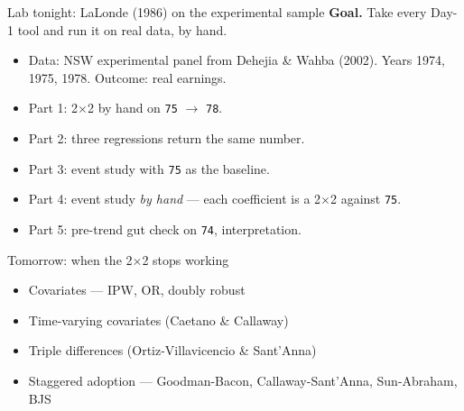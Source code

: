 \documentclass[aspectratio=169,11pt]{beamer}
\begin{document}
\begin{frame}{Lab tonight: LaLonde (1986) on the experimental sample}
\vspace{0.4em}
\textbf{Goal.} Take every Day-1 tool and run it on real data, by hand.
\vspace{0.4em}
\begin{itemize}\small
  \item Data: NSW experimental panel from Dehejia \& Wahba (2002). Years 1974, 1975, 1978. Outcome: real earnings.
  \item Part 1: 2$\times$2 by hand on \texttt{75} $\rightarrow$ \texttt{78}.
  \item Part 2: three regressions return the same number.
  \item Part 3: event study with \texttt{75} as the baseline.
  \item Part 4: event study \textit{by hand} --- each coefficient is a 2$\times$2 against \texttt{75}.
  \item Part 5: pre-trend gut check on \texttt{74}, interpretation.
\end{itemize}
\vspace{0.4em}
\end{frame}

\begin{frame}{Tomorrow: when the 2$\times$2 stops working}
\vspace{0.4em}
\begin{itemize}
  \item Covariates --- IPW, OR, doubly robust
  \item Time-varying covariates (Caetano \& Callaway)
  \item Triple differences (Ortiz-Villavicencio \& Sant'Anna)
  \item Staggered adoption --- Goodman-Bacon, Callaway-Sant'Anna, Sun-Abraham, BJS
\end{itemize}
\end{frame}

\begin{frame}[plain]
\end{frame}
\end{document}
